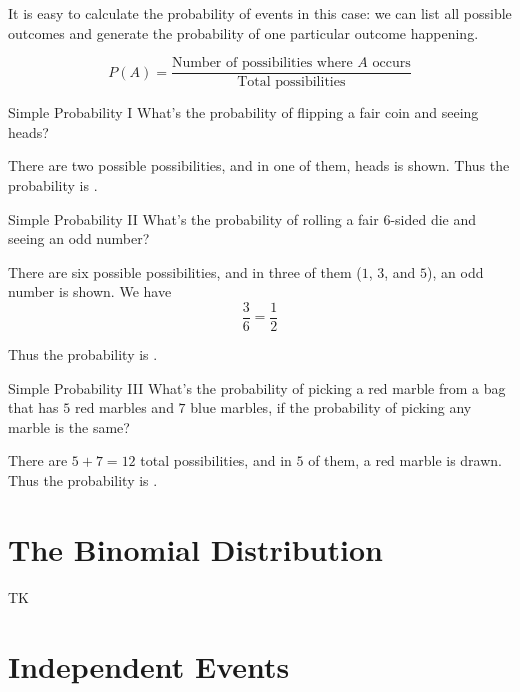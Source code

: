 \documentclass[a4paper,10pt]{report}
\begin{document}
It is easy to calculate the probability of events in this case: we can list all possible
outcomes and generate the probability of one particular outcome happening.

\begin{equation}
 P(A) = \frac{\text{Number of possibilities where \(A\) occurs}}
 {\text{Total possibilities}}
\end{equation}

\begin{problem}{Simple Probability I}
 What's the probability of flipping a fair coin and seeing heads?

 \begin{solution}
  There are two possible possibilities, and in one of them, heads is shown. Thus
  the probability is .
 \end{solution}
\end{problem}

\begin{problem}{Simple Probability II}
 What's the probability of rolling a fair \(6\)-sided die and seeing an odd
 number?

 \begin{solution}
  There are six possible possibilities, and in three of them (\(1\), \(3\), and \(5\)), an
  odd number is shown. We have \[
   \frac{3}{6} = \frac{1}{2}
  \]

  Thus the probability is .
 \end{solution}
\end{problem}

\begin{problem}{Simple Probability III}
 What's the probability of picking a red marble from a bag that has \(5\) red marbles and
 \(7\) blue marbles, if the probability of picking any marble is the same?

 \begin{solution}
  There are \(5+7=12\) total possibilities, and in \(5\) of them, a red marble is drawn.
  Thus the probability is .
 \end{solution}
\end{problem}

\section{The Binomial Distribution}

TK

\section{Independent Events}
\end{document}
